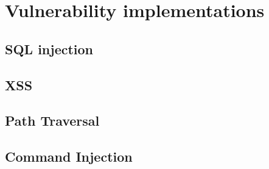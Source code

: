 \chapter{Vulnerability implementations}
\section{SQL injection}\label{appendix:sqli}


\section{XSS}\label{appendix:xss}


\section{Path Traversal}\label{appendix:path_traversal}


\section{Command Injection}\label{appendix:command_injection}


